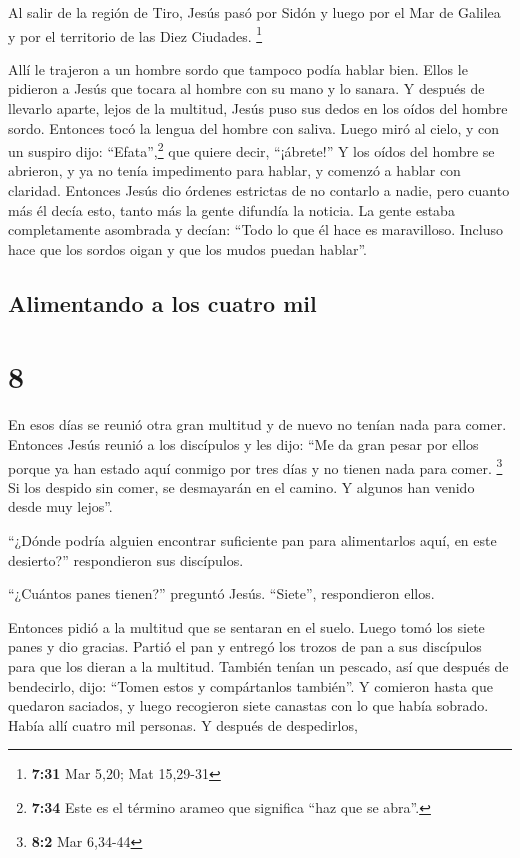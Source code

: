  Al salir de la región de Tiro, Jesús pasó por Sidón y
luego por el Mar de Galilea y por el territorio de las Diez Ciudades.
\footnote{\textbf{7:31} Mar 5,20; Mat 15,29-31}

 Allí le trajeron a un hombre sordo que tampoco podía
hablar bien. Ellos le pidieron a Jesús que tocara al hombre con su mano
y lo sanara.  Y después de llevarlo aparte, lejos de la
multitud, Jesús puso sus dedos en los oídos del hombre sordo. Entonces
tocó la lengua del hombre con saliva.  Luego miró al
cielo, y con un suspiro dijo: ``Efata'',\footnote{\textbf{7:34} Este es
  el término arameo que significa ``haz que se abra''.} que quiere
decir, ``¡ábrete!''  Y los oídos del hombre se abrieron,
y ya no tenía impedimento para hablar, y comenzó a hablar con claridad.
 Entonces Jesús dio órdenes estrictas de no contarlo a
nadie, pero cuanto más él decía esto, tanto más la gente difundía la
noticia.  La gente estaba completamente asombrada y
decían: ``Todo lo que él hace es maravilloso. Incluso hace que los
sordos oigan y que los mudos puedan hablar''.

\hypertarget{alimentando-a-los-cuatro-mil}{%
\subsection{Alimentando a los cuatro
mil}\label{alimentando-a-los-cuatro-mil}}

\hypertarget{section-7}{%
\section{8}\label{section-7}}

 En esos días se reunió otra gran multitud y de nuevo no
tenían nada para comer. Entonces Jesús reunió a los discípulos y les
dijo:  ``Me da gran pesar por ellos porque ya han estado
aquí conmigo por tres días y no tienen nada para comer. \footnote{\textbf{8:2}
  Mar 6,34-44}  Si los despido sin comer, se desmayarán en
el camino. Y algunos han venido desde muy lejos''.

 ``¿Dónde podría alguien encontrar suficiente pan para
alimentarlos aquí, en este desierto?'' respondieron sus discípulos.

 ``¿Cuántos panes tienen?'' preguntó Jesús. ``Siete'',
respondieron ellos.

 Entonces pidió a la multitud que se sentaran en el suelo.
Luego tomó los siete panes y dio gracias. Partió el pan y entregó los
trozos de pan a sus discípulos para que los dieran a la multitud.
 También tenían un pescado, así que después de bendecirlo,
dijo: ``Tomen estos y compártanlos también''.  Y comieron
hasta que quedaron saciados, y luego recogieron siete canastas con lo
que había sobrado.  Había allí cuatro mil personas. Y
después de despedirlos,

